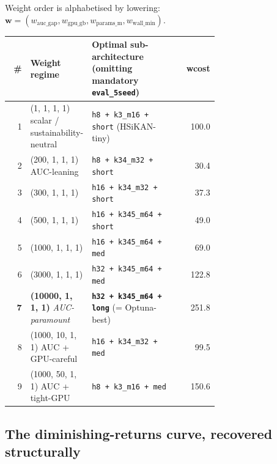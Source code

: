 \documentclass[11pt,a4paper]{article}
\newcommand{\code}[1]{\texttt{\small #1}}
\begin{document}
Weight order is alphabetised by lowering:
$\boldsymbol{w} = (w_{\text{auc\_gap}}, w_{\text{gpu\_gb}}, w_{\text{params\_m}}, w_{\text{wall\_min}})$.

\begin{center}\footnotesize
\begin{tabular}{r p{0.27\linewidth} p{0.41\linewidth} r}
\toprule
\# & Weight regime & Optimal sub-architecture (omitting mandatory \code{eval\_5seed}) & wcost \\
\midrule
1 & (1, 1, 1, 1) scalar / sustainability-neutral & \code{h8 + k3\_m16 + short} (HSiKAN-tiny)        & 100.0 \\
2 & (200, 1, 1, 1) AUC-leaning                   & \code{h8 + k34\_m32 + short}                     & 30.4 \\
3 & (300, 1, 1, 1)                                & \code{h16 + k34\_m32 + short}                    & 37.3 \\
4 & (500, 1, 1, 1)                                & \code{h16 + k345\_m64 + short}                   & 49.0 \\
5 & (1000, 1, 1, 1)                               & \code{h16 + k345\_m64 + med}                     & 69.0 \\
6 & (3000, 1, 1, 1)                               & \code{h32 + k345\_m64 + med}                     & 122.8 \\
\textbf{7} & \textbf{(10000, 1, 1, 1)} \emph{AUC-paramount} & \textbf{\code{h32 + k345\_m64 + long}} (= Optuna-best) & 251.8 \\
\midrule
8 & (1000, 10, 1, 1) AUC + GPU-careful           & \code{h16 + k34\_m32 + med}                      & 99.5 \\
9 & (1000, 50, 1, 1) AUC + tight-GPU             & \code{h8 + k3\_m16 + med}                        & 150.6 \\
\bottomrule
\end{tabular}
\end{center}

\subsection{The diminishing-returns curve, recovered structurally}
\end{document}
